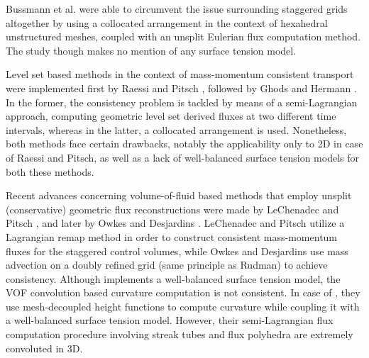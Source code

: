Bussmann et al.  were able to 
circumvent the issue surrounding staggered grids altogether 
by using a collocated arrangement in the context of hexahedral 
unstructured meshes, coupled with an unsplit Eulerian flux computation method.    
The study though makes no mention of any surface tension model. 


Level set based methods in the context of mass-momentum consistent 
transport were implemented first by Raessi and Pitsch , 
followed by Ghods and Hermann \cite{ghods2013consistent}. 
In the former, the consistency problem is tackled by means of a 
semi-Lagrangian approach, computing geometric level set derived 
fluxes at two different time intervals, whereas in the latter, 
a collocated arrangement is used. 
Nonetheless, both methods face certain drawbacks, notably the 
applicability only to 2D in case of Raessi and Pitsch, 
as well as a lack of well-balanced surface tension models for both these methods.   


Recent advances concerning volume-of-fluid based methods that 
employ unsplit (conservative) geometric flux reconstructions 
were made by LeChenadec and Pitsch 
, and later by Owkes and Desjardins \cite{owkes2017mass}. 
LeChenadec and Pitsch utilize a Lagrangian remap method in order 
to construct consistent mass-momentum fluxes for the staggered control volumes, 
while Owkes and Desjardins use mass advection on a doubly refined grid 
(same principle as Rudman) to achieve consistency.     
Although \cite{le2013monotonicity} implements a well-balanced surface tension model, 
the VOF convolution based curvature computation is not consistent. 
In case of , they use mesh-decoupled height functions 
to compute curvature while coupling it with a well-balanced surface tension model. 
However, their semi-Lagrangian flux computation procedure 
involving streak tubes and flux polyhedra are extremely convoluted in 3D.     


